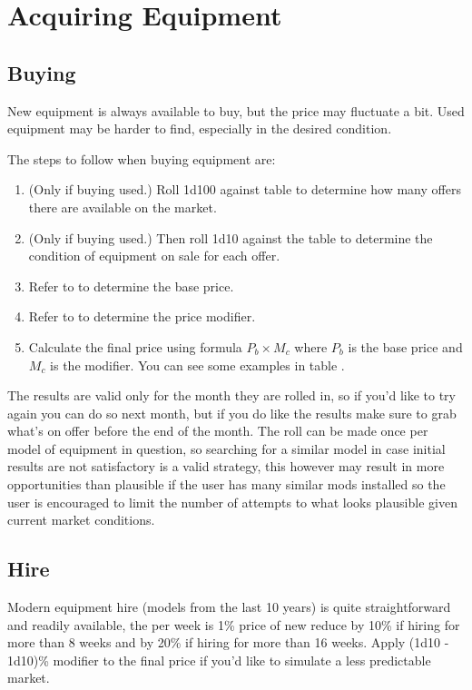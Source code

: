 \documentclass[a4paper,10pt]{article}
\begin{document}
\section{Acquiring Equipment}
\subsection{Buying}
New equipment is always available to buy, but the price may fluctuate a bit.
Used equipment may be harder to find, especially in the desired condition.

The steps to follow when buying equipment are:
\begin{enumerate}
\item (Only if buying used.) Roll 1d100 against table
   to determine how many offers there are
  available on the market.
\item (Only if buying used.) Then roll 1d10 against the table
   to determine the condition of
  equipment on sale for each offer.
\item Refer to  to determine the base price.
\item Refer to  to determine the price
  modifier.
\item Calculate the final price using formula $P_b \times M_c$ where $P_b$ is
  the base price and $M_c$ is the modifier. You can see some examples in table
  .
\end{enumerate}

The results are valid only for the month they are rolled in, so if you'd like to
try again you can do so next month, but if you do like the results make sure to
grab what's on offer before the end of the month. The roll can be made once per
model of equipment in question, so searching for a similar model in case initial
results are not satisfactory is a valid strategy, this however may result in
more opportunities than plausible if the user has many similar mods installed so
the user is encouraged to limit the number of attempts to what looks plausible
given current market conditions.


\subsection{Hire}

Modern equipment hire (models from the last 10 years) is quite straightforward
and readily available, the per week is 1\% price of new reduce by 10\% if hiring
for more than 8 weeks and by 20\% if hiring for more than 16 weeks. Apply (1d10
- 1d10)\% modifier to the final price if you'd like to simulate a less
predictable market.
\end{document}
